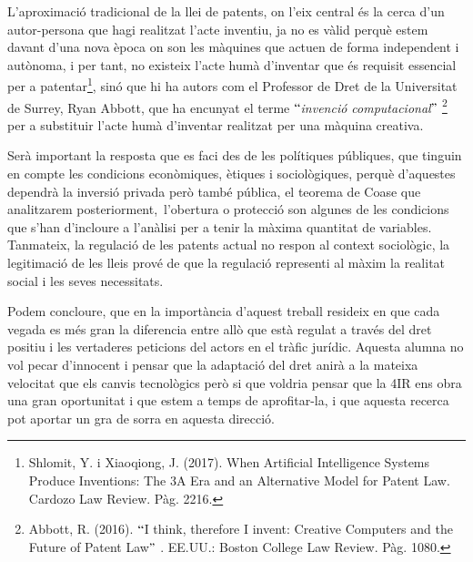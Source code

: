 \documentclass[12pt]{article}
\begin{document}
\begin{justify}
L’aproximació tradicional de la llei de patents, on l’eix central és la cerca d’un autor-persona que hagi realitzat l’acte inventiu, ja no es vàlid perquè estem davant d’una nova època on son les màquines que actuen de forma independent i autònoma, i per tant, no existeix l’acte humà d’inventar que és requisit essencial per a patentar\footnote{ Shlomit, Y. i Xiaoqiong, J. (2017).  When Artificial Intelligence Systems Produce Inventions: The 3A Era and an Alternative Model for Patent Law. Cardozo Law Review. Pàg. 2216.  }, sinó que hi ha autors com el Professor de Dret de la Universitat de Surrey, Ryan Abbott, que ha encunyat el terme $``$\textit{invenció computacional}$"$ \footnote{ Abbott, R. (2016). $``$I think, therefore I invent: Creative Computers and the Future of Patent Law$"$ . EE.UU.: Boston College Law Review. Pàg. 1080.  } per a substituir l’acte humà d’inventar realitzat per una màquina creativa. 
\end{justify}\par


\vspace{\baselineskip}
\begin{justify}
Serà important la resposta que es faci des de les polítiques públiques, que tinguin en compte les condicions econòmiques, ètiques i sociològiques, perquè d’aquestes dependrà la inversió privada però també pública, el teorema de Coase que analitzarem posteriorment,\ l’obertura o protecció son algunes de les condicions que s’han d’incloure a l’anàlisi per a tenir la màxima quantitat de variables.  Tanmateix, la regulació de les patents actual no respon al context sociològic, la legitimació de les lleis prové de que la regulació representi al màxim la realitat social i les seves necessitats.
\end{justify}\par


\vspace{\baselineskip}
\begin{justify}
Podem concloure, que en la importància d’aquest treball resideix en que cada vegada es més gran la diferencia entre allò que està regulat a través del dret positiu i les vertaderes peticions del actors en el tràfic jurídic. Aquesta alumna no vol pecar d’innocent i pensar que la adaptació del dret anirà a la mateixa velocitat que els canvis tecnològics però si que voldria pensar que la 4IR ens obra una gran oportunitat i que estem a temps de aprofitar-la, i que aquesta recerca pot aportar un gra de sorra en aquesta direcció. 
\end{justify}\par
\end{document}

